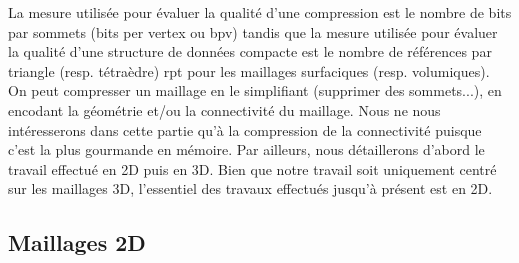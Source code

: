 \documentclass[a4paper,11pt,openany]{article}
\begin{document}
La mesure utilisée pour évaluer la qualité d'une compression est le nombre de bits par sommets (bits per vertex ou bpv) tandis que la mesure utilisée pour évaluer la qualité d'une structure de données compacte est le nombre de références par triangle (resp. tétraèdre) rpt pour les maillages surfaciques (resp. volumiques).\\
On peut compresser un maillage en le simplifiant (supprimer des sommets...), en encodant la géométrie et/ou la connectivité du maillage. Nous ne nous intéresserons dans cette partie qu'à la compression de la connectivité puisque c'est la plus gourmande en mémoire. Par ailleurs, nous détaillerons d'abord le travail effectué en 2D puis en 3D. Bien que notre travail soit uniquement centré sur les maillages 3D, l'essentiel des travaux effectués jusqu'à présent est en 2D.
\subsection{Maillages 2D}
\end{document}
